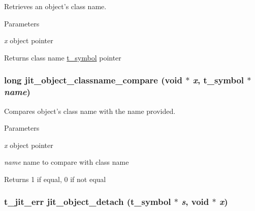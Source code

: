 Retrieves an object's class name. 
\begin{DoxyParams}{Parameters}
\item[{\em x}]object pointer\end{DoxyParams}
\begin{DoxyReturn}{Returns}
class name \hyperlink{structt__symbol}{t\_\-symbol} pointer 
\end{DoxyReturn}
\hypertarget{group__objectmod_ga4fdf2959d720fe67e1ecc777189caa63}{
\subsubsection[{jit\_\-object\_\-classname\_\-compare}]{\setlength{\rightskip}{0pt plus 5cm}long jit\_\-object\_\-classname\_\-compare (void $\ast$ {\em x}, \/  {\bf t\_\-symbol} $\ast$ {\em name})}}
\label{group__objectmod_ga4fdf2959d720fe67e1ecc777189caa63}


Compares object's class name with the name provided. 
\begin{DoxyParams}{Parameters}
\item[{\em x}]object pointer \item[{\em name}]name to compare with class name\end{DoxyParams}
\begin{DoxyReturn}{Returns}
1 if equal, 0 if not equal 
\end{DoxyReturn}
\hypertarget{group__objectmod_gaa286218b643371fe28cbe261facd5b21}{
\subsubsection[{jit\_\-object\_\-detach}]{\setlength{\rightskip}{0pt plus 5cm}t\_\-jit\_\-err jit\_\-object\_\-detach ({\bf t\_\-symbol} $\ast$ {\em s}, \/  void $\ast$ {\em x})}}
\label{group__objectmod_gaa286218b643371fe28cbe261facd5b21}


